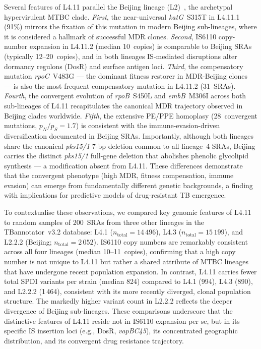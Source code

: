 \documentclass[11pt,a4paper]{article}
\newcommand{\lignee}[1]{\textsf{#1}}
\begin{document}
Several features of \lignee{L4.11} parallel the Beijing lineage (L2)~\cite{merker2015,auganova2025},
the archetypal hypervirulent MTBC clade.
\emph{First}, the near-universal \textit{katG}~S315T in
\lignee{L4.11.1} (91\%) mirrors the fixation of this mutation in
modern Beijing sub-lineages, where it is considered a hallmark of
successful MDR clones.
\emph{Second}, IS6110 copy-number expansion in \lignee{L4.11.2}
(median 10~copies) is comparable to Beijing SRAs (typically
12--20~copies), and in both lineages IS-mediated disruptions alter
dormancy regulons (DosR) and surface antigen loci.
\emph{Third}, the compensatory mutation \textit{rpoC}~V483G --- the
dominant fitness restorer in MDR-Beijing clones~\cite{comas2012}
--- is also the most frequent compensatory mutation in
\lignee{L4.11.2} (31~SRAs).
\emph{Fourth}, the convergent evolution of
\textit{rpoB}~S450L and \textit{embB}~M306I across both sub-lineages
of \lignee{L4.11} recapitulates the canonical MDR trajectory observed in
Beijing clades worldwide.
\emph{Fifth}, the extensive PE/PPE homoplasy (28~convergent
mutations, $p_N/p_S = 1.7$) is consistent with the
immune-evasion-driven diversification documented in Beijing SRAs.
Importantly, although both lineages share the canonical
\textit{pks15/1} 7-bp deletion common to all lineage~4 SRAs,
Beijing carries the distinct \textit{pks15/1} full-gene deletion
that abolishes phenolic glycolipid synthesis --- a modification
absent from \lignee{L4.11}.  These differences demonstrate that the
convergent phenotype (high MDR, fitness compensation, immune
evasion) can emerge from fundamentally different genetic
backgrounds, a finding with implications for predictive models of
drug-resistant TB emergence.

To contextualise these observations, we compared key genomic features
of \lignee{L4.11} to random samples of 200~SRAs from three other
lineages in the TBannotator~v3.2 database: \lignee{L4.1}
($n_{\text{total}} = 14\,496$), \lignee{L4.3} ($n_{\text{total}} = 15\,199$),
and \lignee{L2.2.2} (Beijing; $n_{\text{total}} = 2\,052$).
IS6110 copy numbers are remarkably consistent across all four lineages
(median 10--11~copies), confirming that a high copy number is not
unique to \lignee{L4.11} but rather a shared attribute of MTBC lineages
that have undergone recent population expansion.
In contrast, \lignee{L4.11} carries fewer total SPDI variants per strain
(median 824) compared to \lignee{L4.1} (994), \lignee{L4.3} (890),
and \lignee{L2.2.2} (1\,464), consistent with its more recently
diverged, clonal population structure.
The markedly higher variant count in \lignee{L2.2.2}
reflects the deeper divergence of Beijing sub-lineages.
These comparisons underscore that the distinctive features of
\lignee{L4.11} reside not in IS6110 expansion per se,
but in its specific IS insertion loci (e.g., DosR, \textit{vapBC45}),
its concentrated geographic distribution, and its convergent drug
resistance trajectory.
\end{document}
